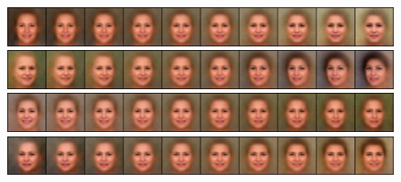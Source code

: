 \documentclass{article}
\begin{document}
\begin{figure}[H]
  \includegraphics[width=0.9\linewidth]{eigen/raw_vae_11.png}
  \includegraphics[width=0.9\linewidth]{eigen/raw_vae_12.png}
  \includegraphics[width=0.9\linewidth]{eigen/raw_vae_13.png}
  \includegraphics[width=0.9\linewidth]{eigen/raw_vae_14.png}
\end{figure}
\end{document}
